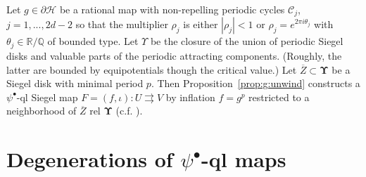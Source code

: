 \documentclass{amsart}
\newcommand{\1}{{\mathbb 1 }}
\newcommand{\bUpsilon}{{\mathbf \Upsilon}}
\newcommand{\C}{\mathbb{C}}
\newcommand{\Q}{\mathbb{Q}}
\newcommand{\R}{\mathbb{R}}
\theoremstyle{remark}
\numberwithin{equation}{section}
\theoremstyle{definition}
\begin{document}
Let $g \in \partial \mathcal{H}$ be a rational map with non-repelling periodic cycles $\mathcal{C}_j$, $j = 1,..., 2d-2$ so that the multiplier $\rho_j$ is either $|\rho_j| < 1$ or $\rho_j = e^{2\pi i \theta_j}$ with $\theta_j \in \R/\Q$ of bounded type.
Let $\Upsilon$ be the closure of the union of periodic Siegel disks and valuable parts of the periodic attracting components. (Roughly, the latter are bounded by equipotentials though the critical value.) Let $\overline Z\subset \bUpsilon$ be a Siegel disk with minimal period $p$. Then Proposition~\ref{prop:g:unwind} constructs a $\psi^\bullet$-ql Siegel map $F=(f, \iota)\colon U \rightrightarrows V$ by inflation $f=g^p$ restricted to a neighborhood of $\overline Z$ rel $\bUpsilon$ (c.f. \cite[\S3]{DL:HypComp}).

\section{Degenerations of $\psi^\bullet$-ql maps}\label{s:Degener_of_psi_bullet}
\end{document}
